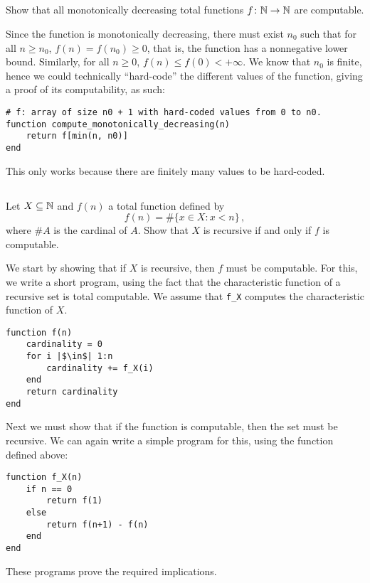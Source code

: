 \subsection{} %
Show that all monotonically decreasing total functions
\(f \colon \mathbb{N} \to \mathbb{N}\) are computable.

\begin{solution}
Since the function is monotonically decreasing,
there must exist \(n_0\) such that
for all \(n \ge n_0\), \(f(n) = f(n_0) \ge 0\),
that is, the function has a nonnegative lower bound.
Similarly, for all \(n \ge 0\), \(f(n) \le f(0) < +\infty\).
We know that \(n_0\) is finite, hence we could technically ``hard-code''
the different values of the function,
giving a proof of its computability, as such:
\begin{verbatim}
# f: array of size n0 + 1 with hard-coded values from 0 to n0.
function compute_monotonically_decreasing(n)
	return f[min(n, n0)]
end
\end{verbatim}
This only works because there are finitely many values to be hard-coded.
\end{solution}

\subsection{} %
Let \(X \subseteq \mathbb{N}\) and \(f(n)\) a total function defined by
\begin{equation}
	f(n) = \# \{x \in X : x < n\}\,,
\end{equation}
where \(\# A\) is the cardinal of \(A\).
Show that \(X\) is recursive if and only if \(f\) is computable.

\begin{solution}
We start by showing that if \(X\) is recursive, then \(f\) must be computable.
For this, we write a short program, using the fact
that the characteristic function of a recursive set is total computable.
We assume that \texttt{f_X}
computes the characteristic function of \(X\).
\begin{verbatim}
function f(n)
	cardinality = 0
	for i |$\in$| 1:n
		cardinality += f_X(i)
	end
	return cardinality
end
\end{verbatim}

Next we must show that if the function is computable,
then the set must be recursive.
We can again write a simple program for this, using the function defined above:
\begin{verbatim}
function f_X(n)
	if n == 0
		return f(1)
	else
		return f(n+1) - f(n)
	end
end
\end{verbatim}

These programs prove the required implications.
\end{solution}

